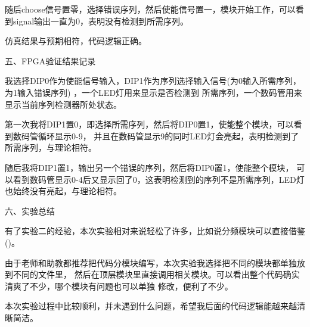 \documentclass[12pt]{article}
\begin{document}
随后choose信号置零，选择错误序列，然后使能信号置一，模块开始工作，可以看到signal输出一直为0，表明没有检测到所需序列。

仿真结果与预期相符，代码逻辑正确。
\begin{highlightedsection}{}
    五、FPGA验证结果记录
\end{highlightedsection}
我选择DIP0作为使能信号输入，DIP1作为序列选择输入信号(为0输入所需序列，为1输入错误序列)
，一个LED灯用来显示是否检测到
所需序列，一个数码管用来显示当前序列检测器所处状态。

第一次我将DIP1置0，即选择所需序列，然后将DIP0置1，使能整个模块，可以看到数码管循环显示0-9，
并且在数码管显示9的同时LED灯会亮起，表明检测到了所需序列，与理论相符。

随后我将DIP1置1，输出另一个错误的序列，然后将DIP0置1，使能整个模块，
可以看到数码管显示0-4后又显示回了0，这表明检测到的序列不是所需序列，LED灯
也始终没有亮起，与理论相符。

\begin{highlightedsection}{}
    六、实验总结
\end{highlightedsection}
有了实验二的经验，本次实验相对来说轻松了许多，比如说分频模块可以直接借鉴()。

由于老师和助教都推荐把代码分模块编写，本次实验我选择把不同的模块都单独放到不同的文件里，
然后在顶层模块里直接调用相关模块。可以看出整个代码确实清爽了不少，哪个模块有问题也可以单独
修改，便利了不少。

本次实验过程中比较顺利，并未遇到什么问题，希望我后面的代码逻辑能越来越清晰简洁。
\end{document}
